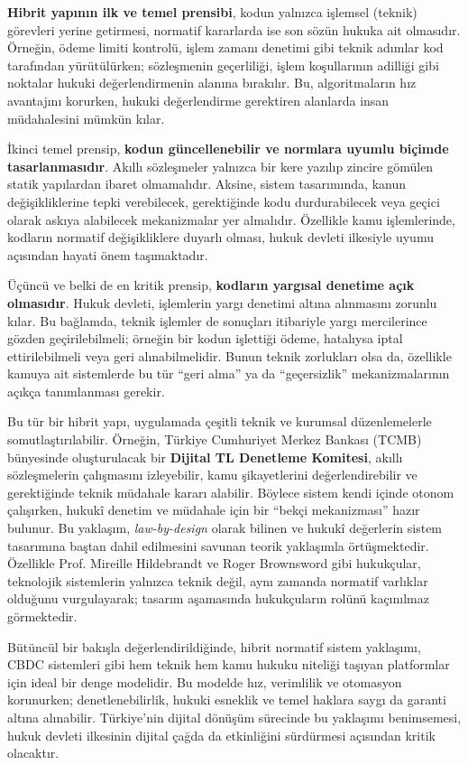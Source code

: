\documentclass[a4paper,12pt]{article}
\begin{document}
\textbf{Hibrit yapının ilk ve temel prensibi}, kodun yalnızca işlemsel (teknik) görevleri yerine getirmesi, normatif kararlarda ise son sözün hukuka ait olmasıdır. Örneğin, ödeme limiti kontrolü, işlem zamanı denetimi gibi teknik adımlar kod tarafından yürütülürken; sözleşmenin geçerliliği, işlem koşullarının adilliği gibi noktalar hukuki değerlendirmenin alanına bırakılır. Bu, algoritmaların hız avantajını korurken, hukuki değerlendirme gerektiren alanlarda insan müdahalesini mümkün kılar.

İkinci temel prensip, \textbf{kodun güncellenebilir ve normlara uyumlu biçimde tasarlanmasıdır}. Akıllı sözleşmeler yalnızca bir kere yazılıp zincire gömülen statik yapılardan ibaret olmamalıdır. Aksine, sistem tasarımında, kanun değişikliklerine tepki verebilecek, gerektiğinde kodu durdurabilecek veya geçici olarak askıya alabilecek mekanizmalar yer almalıdır. Özellikle kamu işlemlerinde, kodların normatif değişikliklere duyarlı olması, hukuk devleti ilkesiyle uyumu açısından hayati önem taşımaktadır.

Üçüncü ve belki de en kritik prensip, \textbf{kodların yargısal denetime açık olmasıdır}. Hukuk devleti, işlemlerin yargı denetimi altına alınmasını zorunlu kılar. Bu bağlamda, teknik işlemler de sonuçları itibariyle yargı mercilerince gözden geçirilebilmeli; örneğin bir kodun işlettiği ödeme, hatalıysa iptal ettirilebilmeli veya geri alınabilmelidir. Bunun teknik zorlukları olsa da, özellikle kamuya ait sistemlerde bu tür ``geri alma'' ya da ``geçersizlik'' mekanizmalarının açıkça tanımlanması gerekir.

Bu tür bir hibrit yapı, uygulamada çeşitli teknik ve kurumsal düzenlemelerle somutlaştırılabilir. Örneğin, Türkiye Cumhuriyet Merkez Bankası (TCMB) bünyesinde oluşturulacak bir \textbf{Dijital TL Denetleme Komitesi}, akıllı sözleşmelerin çalışmasını izleyebilir, kamu şikayetlerini değerlendirebilir ve gerektiğinde teknik müdahale kararı alabilir. Böylece sistem kendi içinde otonom çalışırken, hukukî denetim ve müdahale için bir ``bekçi mekanizması'' hazır bulunur. Bu yaklaşım, \textit{law-by-design} olarak bilinen ve hukukî değerlerin sistem tasarımına baştan dahil edilmesini savunan teorik yaklaşımla örtüşmektedir. Özellikle Prof. Mireille Hildebrandt ve Roger Brownsword gibi hukukçular, teknolojik sistemlerin yalnızca teknik değil, aynı zamanda normatif varlıklar olduğunu vurgulayarak; tasarım aşamasında hukukçuların rolünü kaçınılmaz görmektedir.

Bütüncül bir bakışla değerlendirildiğinde, hibrit normatif sistem yaklaşımı, CBDC sistemleri gibi hem teknik hem kamu hukuku niteliği taşıyan platformlar için ideal bir denge modelidir. Bu modelde hız, verimlilik ve otomasyon korunurken; denetlenebilirlik, hukuki esneklik ve temel haklara saygı da garanti altına alınabilir. Türkiye’nin dijital dönüşüm sürecinde bu yaklaşımı benimsemesi, hukuk devleti ilkesinin dijital çağda da etkinliğini sürdürmesi açısından kritik olacaktır.
\end{document}
